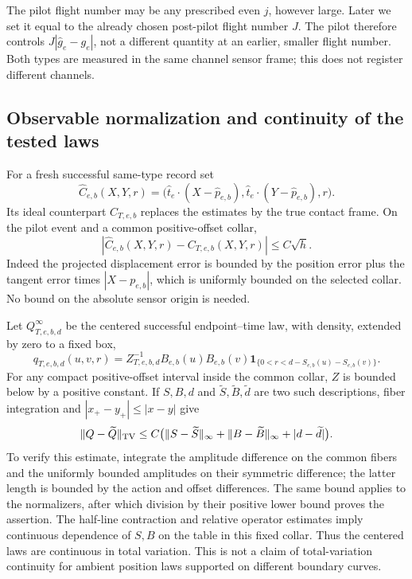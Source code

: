 The pilot flight number may be any prescribed even \(j\), however large.
Later we set it equal to the already chosen post-pilot flight number \(J\).
The pilot therefore controls \(J|\widehat g_e-g_e|\), not a different
quantity at an earlier, smaller flight number.  Both types are measured in
the same channel sensor frame; this does not register different channels.

\subsection{Observable normalization and continuity of the tested laws}

For a fresh successful same-type record set
\begin{equation}\label{eq:v25-observable-normalization}
 \widehat C_{e,b}(X,Y,r)=
 \bigl(\widehat t_e\cdot(X-\widehat p_{e,b}),
       \widehat t_e\cdot(Y-\widehat p_{e,b}),r\bigr).
\end{equation}
Its ideal counterpart \(C_{T,e,b}\) replaces the estimates by the true
contact frame.  On the pilot event and a common positive-offset collar,
\begin{equation}\label{eq:v25-coordinate-error}
             |\widehat C_{e,b}(X,Y,r)-C_{T,e,b}(X,Y,r)|
                                                   \le C\sqrt h.
\end{equation}
Indeed the projected displacement error is bounded by the position error
plus the tangent error times \(|X-p_{e,b}|\), which is uniformly bounded
on the selected collar.  No bound on the absolute sensor origin is needed.

Let \(Q_{T,e,b,d}^{\infty}\) be the centered successful endpoint--time law,
with density, extended by zero to a fixed box,
\begin{equation}\label{eq:v25-centered-density}
 q_{T,e,b,d}(u,v,r)=Z_{T,e,b,d}^{-1}B_{e,b}(u)B_{e,b}(v)
 \mathbf1_{\{0<r<d-S_{e,b}(u)-S_{e,b}(v)\}}.
\end{equation}
For any compact positive-offset interval inside the common collar,
\(Z\) is bounded below by a positive constant.  If \(S,B,d\) and
\(\widetilde S,\widetilde B,\widetilde d\) are two such descriptions,
fiber integration and \(|x_+-y_+|\le|x-y|\) give
\begin{equation}\label{eq:v25-centered-TV-continuity}
 \|Q-\widetilde Q\|_{\rm TV}
 \le C\bigl(\|S-\widetilde S\|_\infty+
             \|B-\widetilde B\|_\infty+|d-\widetilde d|\bigr).
\end{equation}
To verify this estimate, integrate the amplitude difference on the common
fibers and the uniformly bounded amplitudes on their symmetric difference;
the latter length is bounded by the action and offset differences.  The same
bound applies to the normalizers, after which division by their positive
lower bound proves the assertion.  The half-line contraction and relative
operator estimates imply continuous dependence of \(S,B\) on the table in
this fixed collar.  Thus the centered laws are continuous in total variation.
This is not a claim of total-variation continuity for ambient position laws
supported on different boundary curves.

